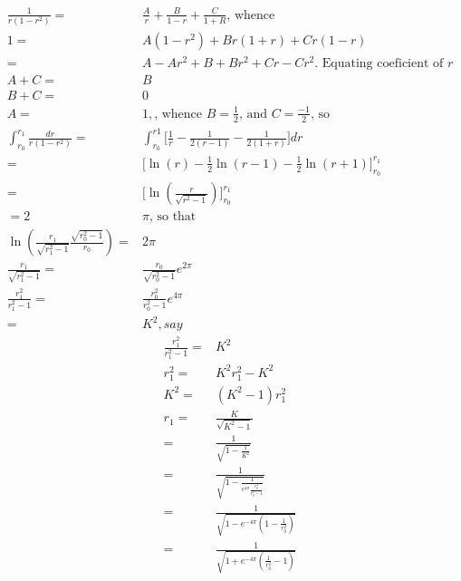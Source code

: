 \documentclass[]{article}
\title{}
\author{}
\begin{document}
\maketitle

\begin{abstract}

\end{abstract}

\section{}

\begin{align*}
\frac{1}{r(1-r^2)}=&\frac{A}{r} + \frac{B}{1-r} + \frac{C}{1+R}\text{, whence}\\
1 =& A(1-r^2) + B r(1+r) + Cr(1-r)\\
=& A -A r^2 + B + B r^2 +Cr -Cr^2\text{. Equating coeficient of $r$}\\
A + C =& B\\
B + C =& 0\\
A=& 1,\text{, whence $B=\frac{1}{2}$, and $C=\frac{-1}{2}$, so}\\
\int_{r_0}^{r_1}\frac{dr}{r(1-r^2)}=&\int_{r_0}^{r1} \big[\frac{1}{r}-\frac{1}{2(r-1)}-\frac{1}{2(1+r)}\big] dr\\
=&\bigg[\ln(r)-\frac{1}{2}\ln(r-1)-\frac{1}{2}\ln(r+1)\bigg]_{r_0}^{r_1}\\
=&\bigg[\ln(\frac{r}{\sqrt{r^2-1}})\bigg]_{r_0}^{r_1}\\
=2&\pi\text{, so that}\\
\ln(\frac{r_1}{\sqrt{r_1^2-1}}\frac{\sqrt{r_0^2-1}}{r_0})=&2 \pi\\
\frac{r_1}{\sqrt{r_1^2-1}}=&\frac{r_0}{\sqrt{r_0^2-1}} e^{2 \pi}\\
\frac{r_1^2}{r_1^2-1}=&\frac{r_0^2}{r_0^2-1} e^{4 \pi}\\
=&K^2{, say}
\end{align*}
\begin{align*}
\frac{r_1^2}{r_1^2-1}=&K^2\\
r_1^2=&K^2 r_1^2 - K^2\\
K^2 =& (K^2-1)r_1^2\\
r_1=&\frac{K}{\sqrt{K^2-1}}\\
=&\frac{1}{\sqrt{1-\frac{1}{K^2}}}\\
=&\frac{1}{\sqrt{1-\frac{1}{e^{4 \pi} \frac{r_0^2}{r_0^2-1}}}}\\
=&\frac{1}{\sqrt{1-e^{-4\pi}(1-\frac{1}{r_0^2})}}\\
=&\frac{1}{\sqrt{1+e^{-4\pi}(\frac{1}{r_0^2}-1)}}
\end{align*}
\end{document}
